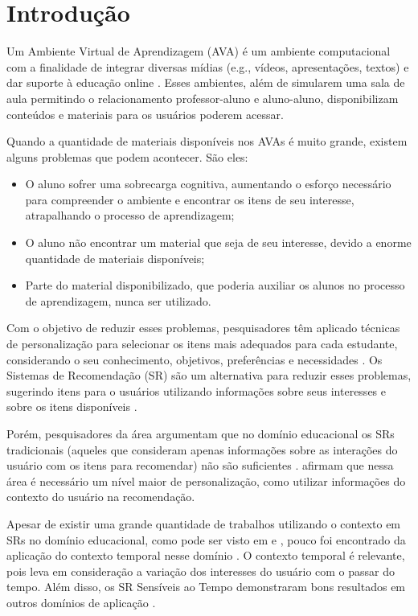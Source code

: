 \chapter{Introdução}\label{introducao}

Um Ambiente Virtual de Aprendizagem (AVA) é um ambiente computacional com a finalidade de integrar diversas mídias
(e.g., vídeos, apresentações, textos) e dar suporte à educação online \cite{drachsler2015panorama}. Esses ambientes, além de simularem uma sala
de aula permitindo o relacionamento professor-aluno e aluno-aluno, disponibilizam conteúdos e materiais para os usuários
poderem acessar.

Quando a quantidade de materiais disponíveis nos AVAs é muito grande, existem alguns problemas que podem acontecer. São eles:

\begin{itemize}
\item O aluno sofrer uma sobrecarga cognitiva, aumentando o esforço necessário para compreender o ambiente
e encontrar os itens de seu interesse, atrapalhando o processo de aprendizagem;
\item O aluno não encontrar um material que seja de seu interesse, devido a enorme quantidade de materiais disponíveis;
\item Parte do material disponibilizado, que poderia auxiliar os alunos no processo de aprendizagem, nunca ser
utilizado.
\end{itemize}

Com o objetivo de reduzir esses problemas, pesquisadores têm aplicado técnicas de personalização para selecionar os
itens mais adequados para cada estudante, considerando o seu conhecimento, objetivos, preferências e necessidades
\cite{brusilovsky1998methods}. Os Sistemas de Recomendação (SR) são um alternativa para reduzir esses problemas, sugerindo
itens para o usuários utilizando informações sobre seus interesses e sobre os itens disponíveis \cite{adomavicius2005toward}.

Porém, pesquisadores da área argumentam que no domínio educacional os SRs tradicionais (aqueles que consideram apenas
informações sobre as interações do usuário com os itens para recomendar) não são suficientes \cite{verbert2012context, drachsler2015panorama}.
 afirmam que nessa área é necessário um nível maior de personalização, como utilizar informações
do contexto do usuário na recomendação.

Apesar de existir uma grande quantidade de trabalhos utilizando o contexto em SRs no domínio educacional, como pode ser visto
em  e , pouco foi encontrado da aplicação do contexto
temporal nesse domínio \cite{de2017time}. O contexto temporal é relevante, pois leva em consideração a variação dos
interesses do usuário com o passar do tempo. Além disso, os SR Sensíveis ao Tempo demonstraram bons resultados em outros
domínios de aplicação \cite{campos2014time}.

